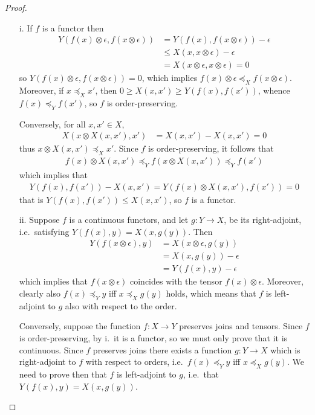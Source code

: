 \begin{proof}
\begin{itemize}
\item[i.] If $f$ is a functor then 
\begin{align*}
Y(f(x)\otimes \epsilon, f(x\otimes \epsilon))&= Y(f(x), f(x\otimes \epsilon)) -\epsilon \\
&\leq X(x, x\otimes \epsilon)-\epsilon \\
&= X(x\otimes \epsilon, x\otimes \epsilon)=0
\end{align*}
so $Y(f(x)\otimes \epsilon, f(x\otimes \epsilon))=0$, which implies
$f(x)\otimes \epsilon \preceq_{X}f(x\otimes \epsilon)$. 
Moreover, if $x\preceq_{X}x'$, then $0\geq X(x,x')\geq Y(f(x),f(x'))$, whence 
$f(x)\preceq_{Y}f(x')$, so $f$ is order-preserving. 

Conversely, for all $x,x'\in X$, 
\begin{align*}
X(x\otimes X(x,x'), x') &=X(x,x')-X(x,x')=0 
\end{align*}
thus $x\otimes X(x,x') \preceq_{X}x'$. Since $f$ is order-preserving, it follows that
\begin{align*}
f(x)\otimes X(x,x') \preceq_{Y}f(x\otimes X(x,x'))\preceq_{Y}f(x') 
\end{align*}
which implies that 
\begin{align*}
Y(f(x),f(x')) - X(x,x') = Y(f(x)\otimes X(x,x'), f(x'))=0
\end{align*}
that is $Y(f(x),f(x'))\leq X(x,x')$, so $f$ is a functor. 

\item[ii.]
Suppose $f$ is a continuous functors, and let  $g:Y\to X$, be its right-adjoint, i.e.~satisfying $Y(f(x),y)=X(x,g(y))$. Then 
\begin{align*}
Y(f(x\otimes \epsilon), y)& = X(x\otimes \epsilon, g(y)) \\
&= X(x, g(y))-\epsilon \\
&= Y(f(x), y)-\epsilon
\end{align*}
which implies that $f(x\otimes \epsilon)$ coincides with the tensor $f(x)\otimes \epsilon$. 
Moreover, clearly also $f(x)\preceq_{Y}y$ iff $x\preceq_{X}g(y)$ holds, which means that $f$ is left-adjoint to $g$ also with respect to the order. 

Conversely, suppose the function $f:X\to Y$ preserves joins and tensors. Since $f$ is order-preserving, by i.~it is a functor, so we must only prove that it is continuous.
Since $f$ preserves joins there exists a function $g:Y\to X$ which is right-adjoint to $f$ with respect to orders, i.e.~$f(x)\preceq_{Y}y$ iff $x\preceq_{X}g(y)$. 
We need to prove then that $f$ is left-adjoint to $g$, i.e.~that $Y(f(x),y)=X(x,g(y))$.


\end{itemize}
\end{proof}

